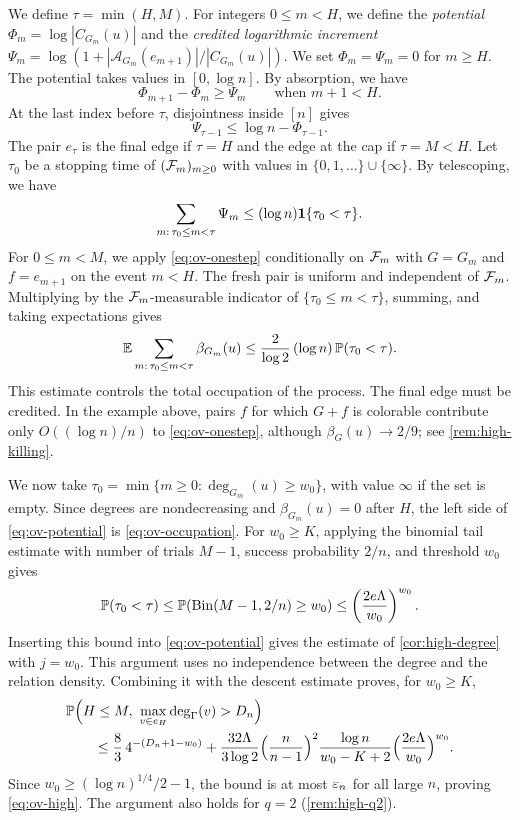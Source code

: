 We define $\tau = \min(H, M)$. For integers $0 \le m < H$, we define the \emph{potential} $\Phi_m = \log|C_{G_m}(u)|$ and the \emph{credited logarithmic increment} $\Psi_m = \log(1 + |\mathscr A_{G_m}(e_{m + 1})|/|C_{G_m}(u)|)$. We set $\Phi_m = \Psi_m = 0$ for $m \ge H$. The potential takes values in $[0, \log n]$. By absorption, we have
\[
\Phi_{m + 1} - \Phi_m \ge \Psi_m\qquad\text{when }m + 1 < H.
\]
At the last index before $\tau$, disjointness inside $[n]$ gives
\[
\Psi_{\tau - 1} \le \log n - \Phi_{\tau - 1}.
\]
The pair $e_\tau$ is the final edge if $\tau = H$ and the edge at the cap if $\tau = M < H$. Let $\tau_0$ be a stopping time of $(\mathcal F_m)_{m \ge 0}$ with values in $\{0, 1, \dots\} \cup \{\infty\}$. By telescoping, we have
\[
\sum_{m : \, \tau_0 \le m < \tau} \Psi_m \le (\log n) \mathbf 1\{\tau_0 < \tau\}.
\]
For $0 \le m < M$, we apply \eqref{eq:ov-onestep} conditionally on $\mathcal F_m$ with $G = G_m$ and $f = e_{m + 1}$ on the event $m < H$. The fresh pair is uniform and independent of $\mathcal F_m$. Multiplying by the $\mathcal F_m$-measurable indicator of $\{\tau_0 \le m < \tau\}$, summing, and taking expectations gives
\begin{equation}\label{eq:ov-potential}
\mathbb E \sum_{m : \, \tau_0 \le m < \tau} \beta_{G_m}(u) \le \frac{2}{\log 2} \, (\log n) \, \mathbb P(\tau_0 < \tau).
\end{equation}
This estimate controls the total occupation of the process. The final edge must be credited. In the example above, pairs $f$ for which $G + f$ is colorable contribute only $O((\log n)/n)$ to \eqref{eq:ov-onestep}, although $\beta_G(u) \to 2/9$; see \cref{rem:high-killing}.

We now take $\tau_0 = \min\{m \ge 0:\deg_{G_m}(u) \ge w_0\}$, with value $\infty$ if the set is empty. Since degrees are nondecreasing and $\beta_{G_m}(u) = 0$ after $H$, the left side of \eqref{eq:ov-potential} is \eqref{eq:ov-occupation}. For $w_0 \ge K$, applying the binomial tail estimate with number of trials $M - 1$, success probability $2/n$, and threshold $w_0$ gives
\[
\mathbb P(\tau_0 < \tau) \le \mathbb P(\operatorname{Bin}(M - 1, 2/n) \ge w_0)
\le \left(\frac{2e\Lambda}{w_0}\right)^{w_0}.
\]
Inserting this bound into \eqref{eq:ov-potential} gives the estimate of \cref{cor:high-degree} with $j = w_0$. This argument uses no independence between the degree and the relation density. Combining it with the descent estimate proves, for $w_0 \ge K$,
\begin{equation}\label{eq:ov-high-final}
\begin{split}
&\mathbb P\Bigl(H \le M, \ \max_{v \in e_H} \deg_\Gamma(v) > D_n\Bigr) \\
&\qquad \le \frac{8}{3} \, 4^{-(D_n + 1 - w_0)} + \frac{32 \Lambda}{3 \log 2} \Bigl(\frac{n}{n - 1}\Bigr)^2 \frac{\log n}{w_0 - K + 2} \Bigl(\frac{2e\Lambda}{w_0}\Bigr)^{w_0}.
\end{split}
\end{equation}
Since $w_0 \ge (\log n)^{1/4}/2 - 1$, the bound is at most $\varepsilon_n$ for all large $n$, proving \eqref{eq:ov-high}. The argument also holds for $q = 2$ (\cref{rem:high-q2}).
